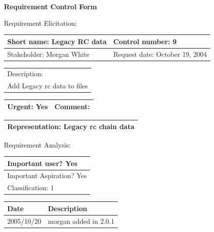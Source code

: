 \begin{center}\Large\bf
Requirement Control Form
\end{center}
\vspace{24pt}

Requirement Elicitation:

\begin{tabular}{|p{211pt}|p{211pt}|} \hline
Short name: Legacy RC data & Control number: 9\\ \hline
Stakeholder: Morgan White & Request date: October 19, 2004\\
\end{tabular}
\begin{tabular}{|p{433pt}|} \hline
Description: \\ 
Add Legacy rc data to files \\
\hline
\end{tabular} 
\begin{tabular}{|p{211pt}|p{211pt}|} \hline
Urgent: Yes & Comment: \\ \hline
\end{tabular}

\vspace{12pt}

\begin{tabular}{|p{433pt}|} \hline
Representation: Legacy rc chain data \\ \hline
\end{tabular}
\vspace{24pt}

Requirement Analysis:

\begin{tabular}{|p{433pt}|} \hline
Important user? Yes \\ \hline
Important Aspiration? Yes \\ \hline
Classification: 1 \\ \hline
\end{tabular}
\vspace{24pt}

\begin{tabular}{|p{72pt}|p{351pt}|} \hline
Date & Description \\ \hline
2005/10/20 & morgan added in 2.0.1 \\ \hline
\end{tabular}
